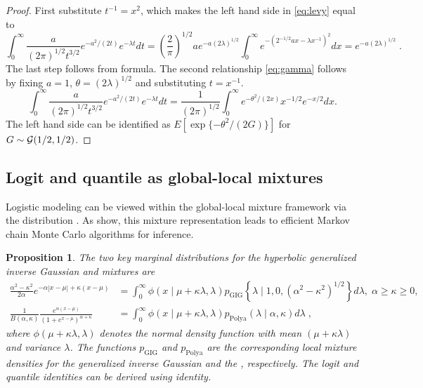\documentclass[bj]{imsart}
\newtheorem{proposition}[theorem]{Proposition}
\begin{document}
\begin{proof}
First substitute $t^{-1} = x^2$, which makes the left hand side in \eqref{eq:levy} equal to 
\[
  \int_{0}^{\infty} \frac{a}{(2 \pi)^{1/2} t^{3/2}} e^{-{a^2}/({2 t})} e^{-\lambda t} dt = \left(\frac{2}{\pi}\right)^{1/2}ae^{-a (2 \lambda)^{1/2}} 
  \int_0^{\infty} e^{-({2}^{-1/2} ax - \lambda x^{-1})^2} dx = e^{-a (2 \lambda)^{1/2}}\;.
\]
The last step follows from \CS{} formula.  The second relationship \eqref{eq:gamma} follows by fixing $a = 1$, $\theta = (2\lambda)^{1/2}$ and
substituting $t = x^{-1}$.
\[
\int_{0}^{\infty} \frac{a}{(2 \pi)^{1/2} t^{3/2}} e^{-{a^2}/({2 t})} e^{-\lambda t} dt = \frac{1}{(2 \pi)^{1/2}} \int_{0}^{\infty} e^{-{\theta^2}/({2x})} 
x^{-1/2} e^{-x/2} dx.
\]
The left hand side can be identified as $E \left[ \exp\{-\theta^2/(2G)\} \right]$ for $G \sim \mathcal{G}(1/2, 1/2)$. 
\end{proof}

\subsection{Logit and quantile as global-local mixtures}

Logistic modeling can be viewed within the global-local mixture framework via the \PG{} distribution \citep{polson_bayesian_2013}. As \citet{polson_bayesian_2013} show, this mixture representation leads to efficient Markov chain Monte Carlo algorithms for inference. 
\begin{proposition}
The two key marginal distributions for the hyperbolic generalized inverse Gaussian \citep{barndorff1982normal} and \PG{} mixtures are
\begin{align}
 \frac{\alpha^2 - \kappa^2}{2\alpha} e^{-\alpha|x-\mu| + \kappa (x-\mu)} &= \int_0^{\infty} \phi(x \mid \mu + \kappa \lambda, \lambda) p_{\mathrm{GIG}}\left\{ \lambda \mid 1,0, (\alpha^2 - \kappa^2)^{1/2}\right\} d\lambda, \; \alpha \geq \kappa \geq 0, \label{eq:GIG}\\
\frac{1}{B(\alpha,\kappa)} \frac{e^{\alpha (x-\mu)}}{(1+e^{x-\mu})^{\alpha + \kappa}}&= \int_0^{\infty} \phi(x \mid \mu + \kappa \lambda, \lambda)p_{\mathrm{Polya}}(\lambda \mid \alpha,\kappa)  d\lambda\;, \label{eq:polya}
\end{align}
where $\phi(\mu + \kappa \lambda, \lambda)$ denotes the normal density function with mean $(\mu + \kappa \lambda)$ and variance $\lambda$.  The functions $p_{\mathrm{GIG}}$ and $p_{\mathrm{Polya}}$ are the corresponding local mixture densities for the generalized inverse Gaussian and the \PG{}, respectively. The logit and quantile identities can be derived using \CS{} identity. 
\end{proposition}
\end{document}
